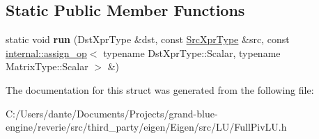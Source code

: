 \subsection*{Static Public Member Functions}
\begin{DoxyCompactItemize}
\item 
\mbox{\label{struct_eigen_1_1internal_1_1_assignment_3_01_dst_xpr_type_00_01_inverse_3_01_full_piv_l_u_3_01_m9a195c884433725cd2990fc22dc66c56_a231169f7021568601b2e13f3e5a6257c}} 
static void {\bfseries run} (Dst\+Xpr\+Type \&dst, const \mbox{\hyperlink{class_eigen_1_1_inverse}{Src\+Xpr\+Type}} \&src, const \mbox{\hyperlink{struct_eigen_1_1internal_1_1assign__op}{internal\+::assign\+\_\+op}}$<$ typename Dst\+Xpr\+Type\+::\+Scalar, typename Matrix\+Type\+::\+Scalar $>$ \&)
\end{DoxyCompactItemize}


The documentation for this struct was generated from the following file\+:\begin{DoxyCompactItemize}
\item 
C\+:/\+Users/dante/\+Documents/\+Projects/grand-\/blue-\/engine/reverie/src/third\+\_\+party/eigen/\+Eigen/src/\+L\+U/Full\+Piv\+L\+U.\+h\end{DoxyCompactItemize}
